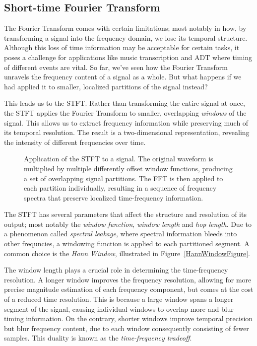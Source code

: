 \subsection{Short-time Fourier Transform}

The Fourier Transform comes with certain limitations; most notably in how, by transforming a signal into the frequency domain, we lose its temporal structure. Although this loss of time information may be acceptable for certain tasks, it poses a challenge for applications like music transcription and \gls{ADT} where timing of different events are vital. So far, we've seen how the Fourier Transform unravels the frequency content of a signal as a whole. But what happens if we had applied it to smaller, localized partitions of the signal instead?

This leads us to the \gls{STFT}. Rather than transforming the entire signal at once, the \gls{STFT} applies the Fourier Transform to smaller, overlapping \textit{windows} of the signal. This allows us to extract frequency information while preserving much of its temporal resolution. The result is a two-dimensional representation, revealing the intensity of different frequencies over time.

\begin{figure}[H]
    \centering
    
    \caption{Application of the \gls{STFT} to a signal. The original waveform is multiplied by multiple differently offset window functions, producing a set of overlapping signal partitions. The \gls{FFT} is then applied to each partition individually, resulting in a sequence of frequency spectra that preserve localized time-frequency information.}
    \label{STFTFigure}
\end{figure}

The \gls{STFT} has several parameters that affect the structure and resolution of its output; most notably the \textit{window function}, \textit{window length} and \textit{hop length}. Due to a phenomenon called \textit{spectral leakage}, where spectral information bleeds into other frequncies, a windowing function is applied to each partitioned segment. A common choice is the \textit{Hann Window}, illustrated in Figure~\ref{HannWindowFigure}.

The window length plays a crucial role in determining the time-frequency resolution. A longer window improves the frequency resolution, allowing for more precise magnitude estimation of each frequency component, but comes at the cost of a reduced time resolution. This is because a large window spans a longer segment of the signal, causing individual windows to overlap more and blur timing information. On the contrary, shorter windows improve temporal precision but blur frequency content, due to each window consequently consisting of fewer samples. This duality is known as the \textit{time-frequency tradeoff}.

